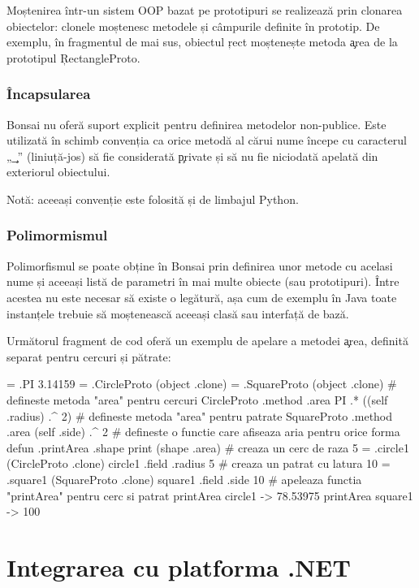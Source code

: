 \documentclass[12pt,a4paper]{memoir}
\begin{document}
Moștenirea într-un sistem OOP bazat pe prototipuri se realizează prin clonarea obiectelor: clonele moștenesc metodele și câmpurile definite în prototip. De exemplu, în fragmentul de mai sus, obiectul \c{rect} moștenește metoda \c{area} de la prototipul \c{RectangleProto}.

\subsection{Încapsularea}

Bonsai nu oferă suport explicit pentru definirea metodelor non-publice. Este utilizată în schimb convenția ca orice metodă al cărui nume începe cu caracterul „\c{\_}” (liniuță-jos) să fie considerată \c{private} și să nu fie niciodată apelată din exteriorul obiectului.

Notă: aceeași convenție este folosită și de limbajul Python\cite{python_classes}.

\subsection{Polimormismul}

Polimorfismul se poate obține în Bonsai prin definirea unor metode cu acelasi nume și aceeași listă de parametri în mai multe obiecte (sau prototipuri). Între acestea nu este necesar să existe o legătură, așa cum de exemplu în Java toate instanțele trebuie să moștenească aceeași clasă sau interfață de bază.

Următorul fragment de cod oferă un exemplu de apelare a metodei \c{area}, definită separat pentru cercuri și pătrate:
\begin{code}
= .PI 3.14159
= .CircleProto (object .clone)
= .SquareProto (object .clone)
# defineste metoda "area" pentru cercuri
CircleProto .method .area {
  PI .* ((self .radius) .^ 2)
}
# defineste metoda "area" pentru patrate
SquareProto .method .area { 
  (self .side) .^ 2 
}
# defineste o functie care afiseaza aria pentru orice forma
defun .printArea .shape { 
  print (shape .area)
}
# creaza un cerc de raza 5
= .circle1 (CircleProto .clone)
circle1 .field .radius 5
# creaza un patrat cu latura 10
= .square1 (SquareProto .clone)
square1 .field .side 10
# apeleaza functia "printArea" pentru cerc si patrat
printArea circle1
  -> 78.53975
printArea square1
  -> 100
\end{code}

\chapter{Integrarea cu platforma .NET}\label{ch:IntegratingWithDotNet}
\end{document}
